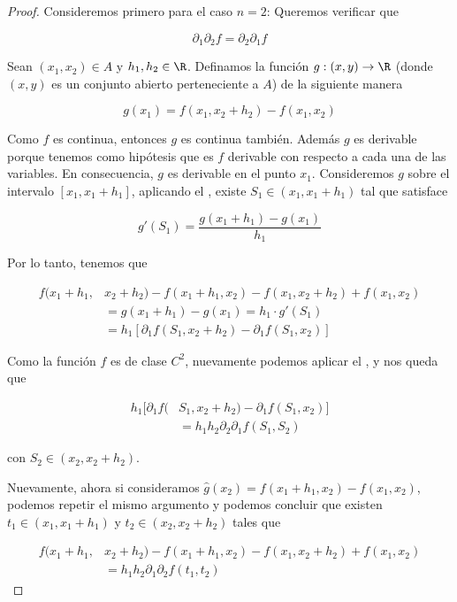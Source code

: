 \begin{proof}
    Consideremos primero para el caso $n = 2$: Queremos verificar que
    
    \[
    \partial_1\partial_2f = \partial_2\partial_1f
    \]
    
    Sean $(x_1, x_2) \in A$ y $h_1, h_2 \in \R$. Definamos la función $g: (x,y) \rightarrow \R$ (donde $(x,y)$ es un conjunto abierto perteneciente a $A$) de la siguiente manera
    
    \[
    g(x_1) = f(x_1, x_2 + h_2) - f(x_1, x_2)
    \]
    
    Como $f$ es continua, entonces $g$ es continua también. Además $g$ es derivable porque tenemos como hipótesis que es $f$ derivable con respecto a cada una de las variables. En consecuencia, $g$ es derivable en el punto $x_1$. Consideremos $g$ sobre el intervalo $[x_1, x_1 + h_1]$, aplicando el \TVM, existe $S_1 \in (x_1, x_1 + h_1)$ tal que satisface
    
    \[
    g'(S_1) = \frac{g(x_1 + h_1) - g(x_1)}{h_1}
    \]
    
    Por lo tanto, tenemos que
    
    \begin{align*}
        f(x_1 + h_1, &x_2 + h_2) - f(x_1 + h_1, x_2) - f(x_1, x_2 + h_2) + f(x_1, x_2) \\
            &= g(x_1 + h_1) - g(x_1) = h_1 \cdot g'(S_1) \\
            &= h_1 \left[ \partial_1 f(S_1, x_2 + h_2) - \partial_1 f(S_1, x_2) \right]
    \end{align*}
    
    Como la función $f$ es de clase $C^2$, nuevamente podemos aplicar el \TVM, y nos queda que
    
    \begin{align}\label{eq:1.2.1}
        h_1 \big[ \partial_1 f(&S_1, x_2 + h_2) - \partial_1 f(S_1, x_2) \big] \nonumber \\
            &= h_1h_2 \partial_2\partial_1 f(S_1, S_2)
    \end{align}
    
    \noindent con $S_2 \in (x_2, x_2 + h_2)$.
    
    Nuevamente, ahora si consideramos $\hat{g}(x_2) = f(x_1 + h_1, x_2) - f(x_1, x_2)$, podemos repetir el mismo argumento y podemos concluir que existen $t_1 \in (x_1, x_1 + h_1)$ y $t_2 \in (x_2, x_2 + h_2)$ tales que
    
    \begin{align}\label{eq:1.2.2}
        f(x_1 + h_1, &x_2 + h_2) - f(x_1 + h_1, x_2) - f(x_1, x_2 + h_2) + f(x_1, x_2) \nonumber \\
            &= h_1h_2 \partial_1\partial_2 f(t_1, t_2)
    \end{align}
    

\end{proof}

